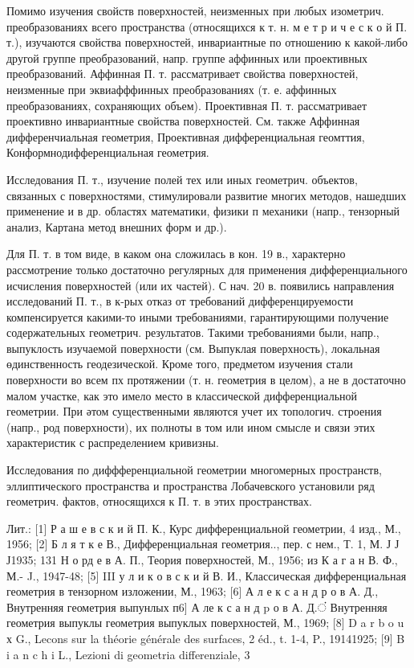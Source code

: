 \documentclass[10pt]{article}
\begin{document}
Помимо изучения свойств поверхностей, неизменных при любых изометрич. преобразованиях всего пространства (относящихся к т. н. м е т р и ч е с к о й П. т.), изучаются свойства поверхностей, инвариантные по отношению к какой-либо другой группе преобразований, напр. группе аффинных или проективных преобразований. Аффинная П. т. рассматривает свойства поверхностей, неизменные при эквиафффинных преобразованиях (т. е. аффинных преобразованиях, сохраняющих объем). Проективная П. т. рассматривает проективно инвариантные свойства поверхностей. См. также Аффинная дифференчиальная геометрия, Проективная дифференциальная геомттия, Конформнодифференциальная геометрия.



Исследования П. т., изучение полей тех или иных геометрич. объектов, связанных с поверхностями, стимулировали развитие многих методов, нашедших применение и в др. областях математики, физики п механики (напр., тензорный анализ, Картана метод внешних форм и др.).



Для П. т. в том виде, в каком она сложилась в кон. 19 в., характерно рассмотрение только достаточно регулярных для применения дифференциального исчисления поверхностей (или их частей). С нач. 20 в. появились направления исследований П. т., в к-рых отказ от требований дифференцируемости компенсируется какими-то иными требованиями, гарантирующими получение содержательных геометрич. результатов. Такими требованиями были, напр., выпуклость изучаемой поверхности (см. Выпуклая поверхность), локальная өдинственность геодезической. Кроме того, предметом изучения стали поверхности во всем пх протяжении (т. н. геометрия в целом), а не в достаточно малом участке, как это имело место в классической дифференциальной геометрии. При әтом существенными являются учет их топологич. строения (напр., род поверхности), их полноты в том или ином смысле и связи этих характеристик с распределением кривизны.



Исследования по диффференциальной геометрии многомерных пространств, эллиптического пространства и пространства Лобачевского установили ряд геометрич. фактов, относящихся к П. т. в этих пространствах.



Лит.: [1] Р а ш е в с к и й П. К., Курс дифференциальной геометрии, 4 изд., М., 1956; [2] Б л я т к е В., Дифференциальная геометрия.., пер. с нем., Т. 1, М. Ј Ј Ј1935; 131 Н о рд е в А. П., Теория поверхностей, М., 1956; из К а г а н В. Ф., М.- J., 1947-48; [5] III у л и к о в с к и й В. И., Классическая дифференциальная геометрия в тензорном изложении, М., 1963; [6] А л е к с а н д р о в А. Д., Внутренняя геометрия выпунлых п6] А ле к с а н д p о в А. Д.ं Внутренняя геометрия выпуклы геометрия выпуклых поверхностей, М., 1969; [8] D a r b o u х G., Lecons sur la théorie générale des surfaces, 2 éd., t. 1-4, P., 19141925; [9] B i a n c h i L., Lezioni di geometria differenziale, 3
\end{document}
